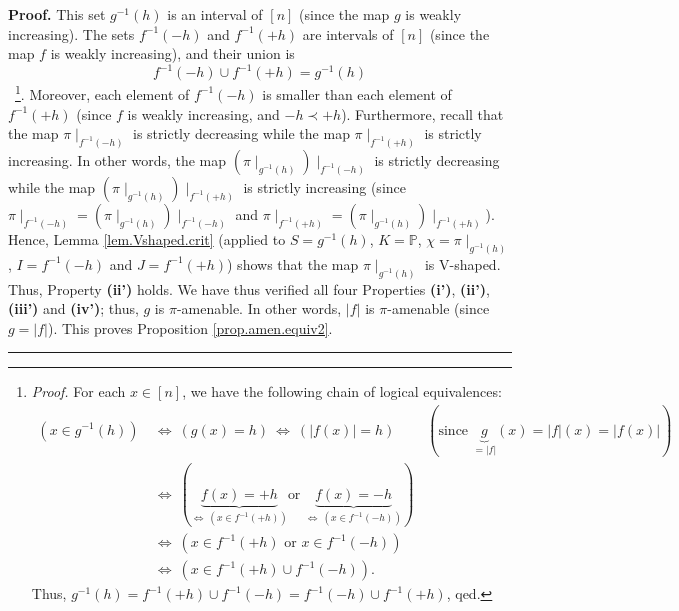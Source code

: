 \documentclass[numbers=enddot,12pt,final,onecolumn,notitlepage]{scrartcl}%
\theoremstyle{definition}
\newenvironment{proof}[1][Proof]{\noindent\textbf{#1.} }{\ \rule{0.5em}{0.5em}}
\newenvironment{verlong}{}{}
\begin{document}
\begin{verlong}
\begin{proof}
This set $g^{-1}\left(  h\right)  $ is an interval of $\left[  n\right]  $
(since the map $g$ is weakly increasing). The sets $f^{-1}\left(  -h\right)  $
and $f^{-1}\left(  +h\right)  $ are intervals of $\left[  n\right]  $ (since
the map $f$ is weakly increasing), and their union is
\[
f^{-1}\left(  -h\right)  \cup f^{-1}\left(  +h\right)  =g^{-1}\left(
h\right)
\]
\ \footnote{\textit{Proof.} For each $x\in\left[  n\right]  $, we have the
following chain of logical equivalences:%
\begin{align*}
\left(  x\in g^{-1}\left(  h\right)  \right)  \  &  \Longleftrightarrow
\ \left(  g\left(  x\right)  =h\right)  \ \Longleftrightarrow\ \left(
\left\vert f\left(  x\right)  \right\vert =h\right)
\ \ \ \ \ \ \ \ \ \ \left(  \text{since }\underbrace{g}_{=\left\vert
f\right\vert }\left(  x\right)  =\left\vert f\right\vert \left(  x\right)
=\left\vert f\left(  x\right)  \right\vert \right) \\
&  \Longleftrightarrow\ \left(  \underbrace{f\left(  x\right)  =+h}%
_{\Longleftrightarrow\ \left(  x\in f^{-1}\left(  +h\right)  \right)  }\text{
or }\underbrace{f\left(  x\right)  =-h}_{\Longleftrightarrow\ \left(  x\in
f^{-1}\left(  -h\right)  \right)  }\right) \\
&  \Longleftrightarrow\ \left(  x\in f^{-1}\left(  +h\right)  \text{ or }x\in
f^{-1}\left(  -h\right)  \right) \\
&  \Longleftrightarrow\ \left(  x\in f^{-1}\left(  +h\right)  \cup
f^{-1}\left(  -h\right)  \right)  .
\end{align*}
Thus, $g^{-1}\left(  h\right)  =f^{-1}\left(  +h\right)  \cup f^{-1}\left(
-h\right)  =f^{-1}\left(  -h\right)  \cup f^{-1}\left(  +h\right)  $, qed.}.
Moreover, each element of $f^{-1}\left(  -h\right)  $ is smaller than each
element of $f^{-1}\left(  +h\right)  $ (since $f$ is weakly increasing, and
$-h\prec+h$). Furthermore, recall that the map $\pi\mid_{f^{-1}\left(
-h\right)  }$ is strictly decreasing while the map $\pi\mid_{f^{-1}\left(
+h\right)  }$ is strictly increasing. In other words, the map $\left(  \pi
\mid_{g^{-1}\left(  h\right)  }\right)  \mid_{f^{-1}\left(  -h\right)  }$ is
strictly decreasing while the map $\left(  \pi\mid_{g^{-1}\left(  h\right)
}\right)  \mid_{f^{-1}\left(  +h\right)  }$ is strictly increasing (since
$\pi\mid_{f^{-1}\left(  -h\right)  }=\left(  \pi\mid_{g^{-1}\left(  h\right)
}\right)  \mid_{f^{-1}\left(  -h\right)  }$ and $\pi\mid_{f^{-1}\left(
+h\right)  }=\left(  \pi\mid_{g^{-1}\left(  h\right)  }\right)  \mid
_{f^{-1}\left(  +h\right)  }$). Hence, Lemma \ref{lem.Vshaped.crit} (applied
to $S=g^{-1}\left(  h\right)  $, $K=\mathbb{P}$, $\chi=\pi\mid_{g^{-1}\left(
h\right)  }$, $I=f^{-1}\left(  -h\right)  $ and $J=f^{-1}\left(  +h\right)  $)
shows that the map $\pi\mid_{g^{-1}\left(  h\right)  }$ is V-shaped. Thus,
Property \textbf{(ii')} holds. We have thus verified all four Properties
\textbf{(i')}, \textbf{(ii')}, \textbf{(iii')} and \textbf{(iv')}; thus, $g$
is $\pi$-amenable. In other words, $\left\vert f\right\vert $ is $\pi
$-amenable (since $g=\left\vert f\right\vert $). This proves Proposition
\ref{prop.amen.equiv2}.
\end{proof}


\end{verlong}
\end{document}
